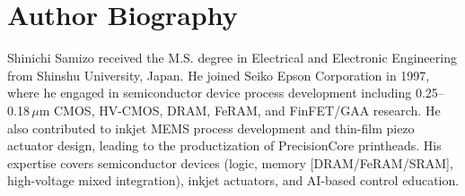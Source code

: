 \documentclass[journal]{IEEEtran}
\begin{document}
\section*{Author Biography}
Shinichi Samizo received the M.S. degree in Electrical and Electronic Engineering from Shinshu University, Japan. He joined Seiko Epson Corporation in 1997, where he engaged in semiconductor device process development including 0.25--0.18\,$\mu$m CMOS, HV-CMOS, DRAM, FeRAM, and FinFET/GAA research. He also contributed to inkjet MEMS process development and thin-film piezo actuator design, leading to the productization of PrecisionCore printheads. His expertise covers semiconductor devices (logic, memory [DRAM/FeRAM/SRAM], high-voltage mixed integration), inkjet actuators, and AI-based control education.
\end{document}
